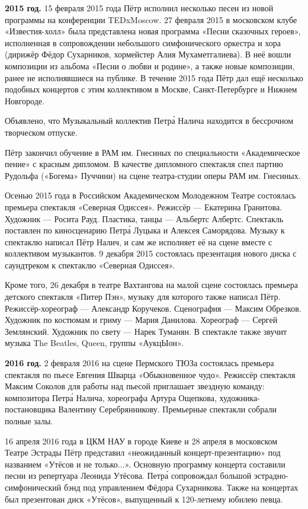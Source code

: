 \textbf{2015 год.}
15 февраля 2015 года Пётр исполнил несколько песен из новой программы на конференции TEDxMoscow. 27 февраля 2015 в московском клубе «Известия-холл» была представлена новая программа «Песни сказочных героев», исполненная в сопровождении небольшого симфонического оркестра и хора (дирижёр Фёдор Сухарников, хормейстер Алия Мухаметгалиева). В неё вошли композиции из альбома «Песни о любви и родине», а также новые композиции, ранее не исполнявшиеся на публике. В течение 2015 года Пётр дал ещё несколько подобных концертов с этим коллективом в Москве, Санкт-Петербурге и Нижнем Новгороде.

Объявлено, что Музыкальный коллектив Петр\'{а} Налича находится в бессрочном творческом отпуске.

Пётр закончил обучение в РАМ им. Гнесиных по специальности «Академическое пение» с красным дипломом. В качестве дипломного спектакля спел партию Рудольфа («Богема» Пуччини) на сцене театра-студии оперы РАМ им. Гнесиных.

Осенью 2015 года в Российском Академическом Молодежном Театре состоялась премьера спектакля «Северная Одиссея». Режиссёр --- Екатерина Гранитова. Художник --- Росита Рауд. Пластика, танцы --- Альбертс Албертс. Спектакль поставлен по киносценарию Петр\'{а} Луцыка и Алексея Саморядова. Музыку к спектаклю написал Пётр Налич, и сам же исполняет её на сцене вместе с коллективом музыкантов. 9 декабря 2015 состоялась презентация нового диска с саундтреком к спектаклю «Северная Одиссея».

Кроме того, 26 декабря в театре Вахтангова на малой сцене состоялась премьера детского спектакля «Питер Пэн», музыку для которого также написал Пётр. Режиссёр-хореограф --- Александр Коручеков. Сценография --- Максим Обрезков. Художник по костюмам и гриму --- Мария Данилова. Хореограф --- Сергей Землянский. Художник по свету --- Нарек Туманян. В спектакле также звучит музыка The Beatles, Queen, группы «АукцЫон».

\textbf{2016 год.}
2 февраля 2016 на сцене Пермского ТЮЗа состоялась премьера спектакля по пьесе Евгения Шварца «Обыкновенное чудо». Режиссёр спектакля Максим Соколов для работы над пьесой приглашает звездную команду: композитора Петр\'{а} Налича, хореографа Артура Ощепкова, художника-постановщика Валентину Серебрянникову. Премьерные спектакли собрали полные залы.

16 апреля 2016 года в ЦКМ НАУ в городе Киеве и 28 апреля в московском Театре Эстрады Пётр представил «неожиданный концерт-презентацию» под названием «Утёсов и не только...». Основную программу концерта составили песни из репертуара Леонида Утёсова. Петр\'{а} сопровождал большой эстрадно-симфонический бэнд под управлением Фёдора Сухарникова. Также на концертах был презентован диск «Утёсов», выпущенный к 120-летнему юбилею певца.

